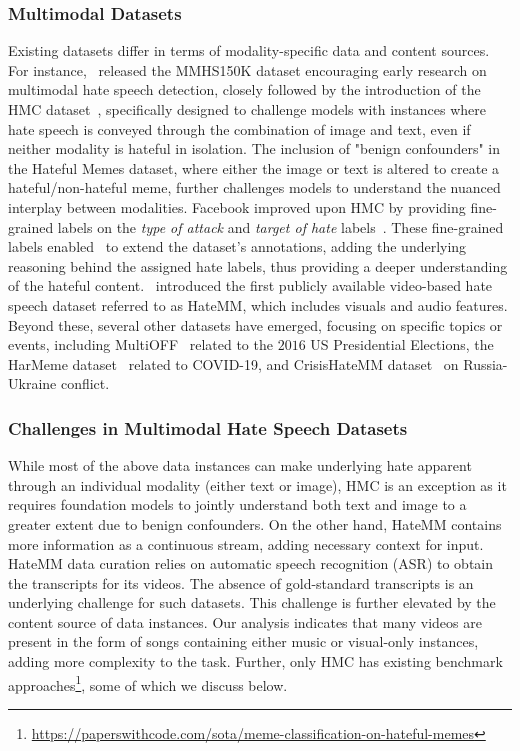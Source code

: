 \subsubsection{Multimodal Datasets}
Existing datasets differ in terms of modality-specific data and content sources. For instance,~\citet{gomez2020exploring} released the MMHS150K dataset encouraging early research on multimodal hate speech detection, closely followed by the introduction of the HMC dataset~\citep{kiela2020hateful}, specifically designed to challenge models with instances where hate speech is conveyed through the combination of image and text, even if neither modality is hateful in isolation. The inclusion of "benign confounders" in the Hateful Memes dataset, where either the image or text is altered to create a hateful/non-hateful meme, further challenges models to understand the nuanced interplay between modalities. Facebook improved upon HMC by providing fine-grained labels on the \textit{type of attack} and \textit{target of hate} labels~\citep{mathias2021findings}. These fine-grained labels enabled~\citet{hee2023decoding} to extend the dataset's annotations, adding the underlying reasoning behind the assigned hate labels, thus providing a deeper understanding of the hateful content.~\citet{das2023hatemm} introduced the first publicly available video-based hate speech dataset referred to as HateMM, which includes visuals and audio features. Beyond these, several other datasets have emerged, focusing on specific topics or events, including MultiOFF~\citep{suryawanshi2020multimodal} related to the $2016$ US Presidential Elections, the HarMeme dataset~\citep{pramanick2021detecting} related to COVID-19, and CrisisHateMM dataset~\citep{bhandari2023crisishatemm} on Russia-Ukraine conflict. 

\subsubsection{Challenges in Multimodal Hate Speech Datasets}
While most of the above data instances can make underlying hate apparent through an individual modality (either text or image), HMC is an exception as it requires foundation models to jointly understand both text and image to a greater extent due to benign confounders. On the other hand, HateMM contains more information as a continuous stream, adding necessary context for input. HateMM data curation relies on automatic speech recognition (ASR) to obtain the transcripts for its videos. The absence of gold-standard transcripts is an underlying challenge for such datasets. This challenge is further elevated by the content source of data instances. Our analysis indicates that many videos are present in the form of songs containing either music or visual-only instances, adding more complexity to the task. Further, only HMC has existing benchmark approaches\footnote{\url{https://paperswithcode.com/sota/meme-classification-on-hateful-memes}}, some of which we discuss below.

